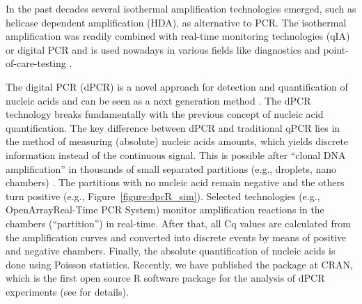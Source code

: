 In the past decades several isothermal amplification technologies
emerged, such as helicase 
dependent amplification (HDA), as alternative to PCR. The isothermal 
amplification 
was readily combined with real-time monitoring technologies (qIA) or digital PCR and is used 
nowadays in various fields like diagnostics and point-of-care-testing 
\citep{selck_2013, rodiger_nucleic_2014, nixon_2014}.

The digital PCR (dPCR) is a novel approach for detection and quantification of 
nucleic acids and can be seen as a next generation method 
\citep{huggett_qpcr_2015}. The dPCR technology 
breaks fundamentally with the previous concept of nucleic acid quantification. 
The key difference between dPCR and traditional qPCR lies in the method of 
measuring (absolute) nucleic acids amounts, which yields discrete information 
instead of the continuous signal. This is possible after ``clonal DNA 
amplification'' in thousands of small separated partitions (e.g., droplets, 
nano 
chambers) \citep{huggett_2013, milbury_2014, morley_2014}. The partitions with 
no 
nucleic acid remain negative and the others turn positive (e.g., 
Figure~\ref{figure:dpcR_sim}). Selected technologies (e.g., 
OpenArray\textregistered Real-Time PCR System) monitor amplification reactions 
in the chambers (``partition'') in real-time. After that, all Cq values are 
calculated from the amplification curves and converted into discrete events by 
means of positive and negative chambers. Finally, the absolute quantification 
of 
nucleic acids is done using Poisson statistics. Recently, we have published the 
 package at CRAN, which is the first 
open source R software package for the analysis of dPCR 
experiments (see  for details).

